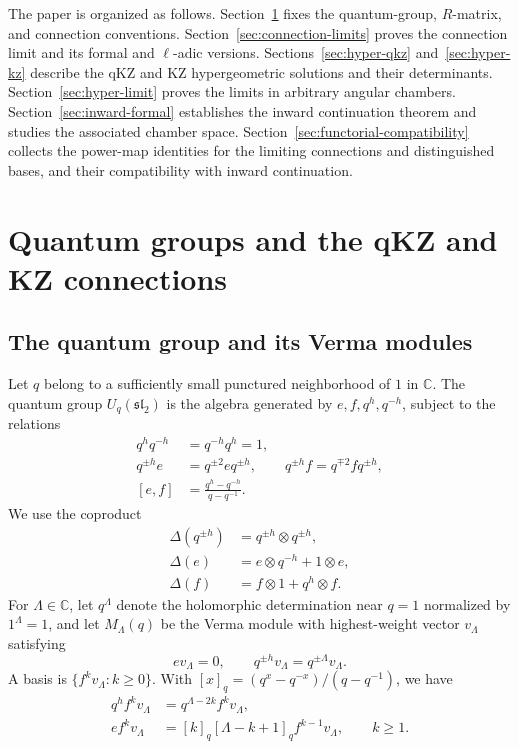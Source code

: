\documentclass[12pt]{amsart}
\let\frak\mathfrak
\theoremstyle{definition}
\numberwithin{equation}{section}
\theoremstyle{definition}
\let\Dl\Delta
\let\La\Lambda
\let\ox\otimes
\let\ge\geqslant
\def\C{{\mathbb C}}
\def\slt{{\frak{sl}_2}}
\newcommand{\Uq}{U_q(\slt)}
\begin{document}
The paper is organized as follows.
Section~\ref{sec:connections} fixes the quantum-group,
$R$-matrix, and connection conventions.
Section~\ref{sec:connection-limits} proves the connection
limit and its formal and $\ell$-adic versions.
Sections~\ref{sec:hyper-qkz} and~\ref{sec:hyper-kz} describe
the qKZ and KZ hypergeometric solutions and their determinants.
Section~\ref{sec:hyper-limit} proves the limits in arbitrary
angular chambers.
Section~\ref{sec:inward-formal} establishes the inward
continuation theorem and studies the associated chamber space.
Section~\ref{sec:functorial-compatibility} collects the
power-map identities for the limiting connections and distinguished
bases, and their compatibility with inward continuation.


\section{Quantum groups and the qKZ and KZ connections}\label{sec:connections}

\subsection{The quantum group and its Verma modules}\label{sec:quantum}

Let $q$ belong to a sufficiently small punctured neighborhood of $1$ in $\C$.
The quantum group $\Uq$ is the algebra generated by
$e,f,q^h,q^{-h}$, subject to the relations
\begin{align}
 q^h q^{-h}&=q^{-h}q^h=1,\nonumber\\
 q^{\pm h}e&=q^{\pm2}e q^{\pm h},\qquad
 q^{\pm h}f=q^{\mp2}f q^{\pm h},\label{eq:quantum-rel}\\
 [e,f]&=\frac{q^h-q^{-h}}{q-q^{-1}}.\nonumber
\end{align}
We use the coproduct
\begin{align}
 \Dl(q^{\pm h})&=q^{\pm h}\ox q^{\pm h},\nonumber\\
 \Dl(e)&=e\ox q^{-h}+1\ox e,\label{eq:coproduct}\\
 \Dl(f)&=f\ox1+q^h\ox f.\nonumber
\end{align}
For $\La\in\C$, let $q^\La$ denote the holomorphic determination
near $q=1$ normalized by $1^\La=1$, and let $M_\La(q)$ be the
Verma module with highest-weight vector $v_\La$ satisfying
\[
 ev_\La=0,\qquad q^{\pm h}v_\La=q^{\pm\La}v_\La.
\]
A basis is $\{f^k v_\La:k\ge0\}$.  With
$[x]_q=(q^x-q^{-x})/(q-q^{-1})$, we have
\begin{align*}
 q^h f^k v_\La&=q^{\La-2k}f^k v_\La,\\
 e f^k v_\La&=[k]_q[\La-k+1]_q f^{k-1}v_\La,\qquad k\ge1.
\end{align*}
\end{document}
